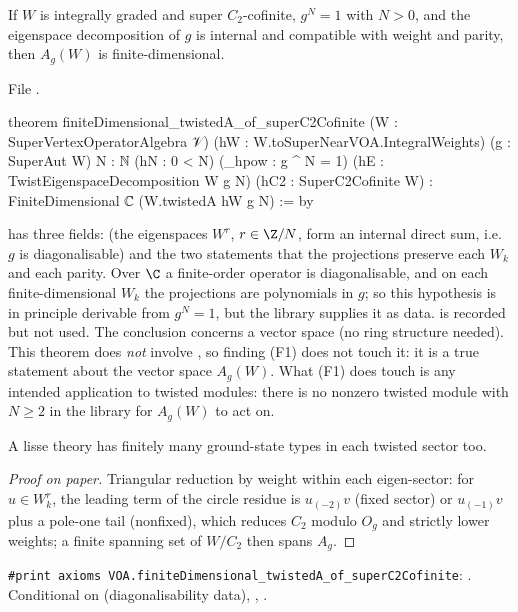 \begin{theorem}\label{l17:thm:twistedzhufinite}
If $W$ is integrally graded and super $C_2$-cofinite, $g^N=1$ with $N>0$, and the eigenspace
decomposition of $g$ is internal and compatible with weight and parity, then $A_g(W)$ is
finite-dimensional.
\end{theorem}
\noindent File .
\begin{leancode}
theorem finiteDimensional_twistedA_of_superC2Cofinite
    (W : SuperVertexOperatorAlgebra 𝒱) (hW : W.toSuperNearVOA.IntegralWeights)
    (g : SuperAut W) {N : ℕ} (hN : 0 < N) (_hpow : g ^ N = 1)
    (hE : TwistEigenspaceDecomposition W g N) (hC2 : SuperC2Cofinite W) :
    FiniteDimensional ℂ (W.twistedA hW g N) := by
\end{leancode}
\begin{dictionary}
 has three fields:  (the eigenspaces
$W^r$, $r\in\Z/N$, form an internal direct sum, i.e.\ $g$ is diagonalisable) and the two statements that
the projections preserve each $W_k$ and each parity. Over $\C$ a finite-order operator is
diagonalisable, and on each finite-dimensional $W_k$ the projections are polynomials in $g$; so this
hypothesis is in principle derivable from $g^N=1$, but the library supplies it as data. 
is recorded but not used. The conclusion concerns a vector space (no ring structure needed). This
theorem does \emph{not} involve , so finding (F1) does not touch it: it is a
true statement about the vector space $A_g(W)$. What (F1) does touch is any intended application to
twisted modules: there is no nonzero twisted module with $N\ge2$ in the library for $A_g(W)$ to act on.
\end{dictionary}
\begin{physics}
A lisse theory has finitely many ground-state types in each twisted sector too.
\end{physics}
\begin{proof}[Proof on paper]
Triangular reduction by weight within each eigen-sector: for $u\in W^r_k$, the leading term of the
circle residue is $u_{(-2)}v$ (fixed sector) or $u_{(-1)}v$ plus a pole-one tail (nonfixed), which
reduces $C_2$ modulo $O_g$ and strictly lower weights; a finite spanning set of $W/C_2$ then spans
$A_g$.
\end{proof}
\begin{status}
\texttt{\#print axioms VOA.finiteDimensional\_twistedA\_of\_superC2Cofinite}: . Conditional on  (diagonalisability data), ,
.
\end{status}

